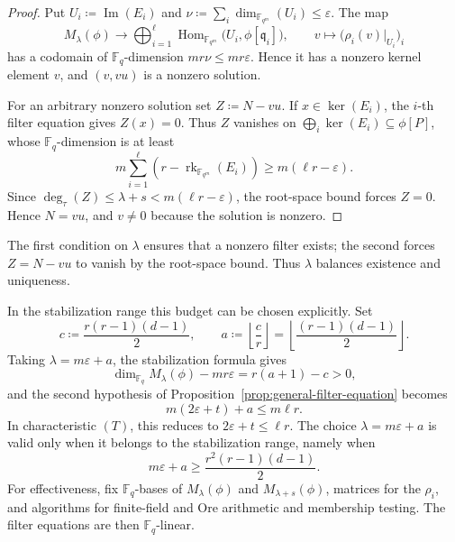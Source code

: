 \documentclass[10pt,a4paper]{amsart}
\DeclareMathOperator{\Hom}{Hom}
\DeclareMathOperator{\rk}{rk}
\theoremstyle{definition}
\theoremstyle{plain}
\theoremstyle{remark}
\newcommand{\vF}{\mathbb F}
\renewcommand{\epsilon}{\varepsilon}
\begin{document}
\begin{proof}
Put $U_i\coloneqq\operatorname{Im}(E_i)$ and
$\nu\coloneqq\sum_i\dim_{\vF_{q^m}}(U_i)\leq\epsilon$. The map
$$
M_\lambda(\phi)
\longrightarrow
\bigoplus_{i=1}^{\ell}
\Hom_{\vF_{q^m}}\bigl(U_i,\phi[\mathfrak q_i]\bigr),
\qquad
v\longmapsto\bigl(\rho_i(v)|_{U_i}\bigr)_i
$$
has a codomain of $\vF_q$-dimension $mr\nu\leq mr\epsilon$. Hence it has a
nonzero kernel element $v$, and $(v,vu)$ is a nonzero solution.

For an arbitrary nonzero solution set $Z\coloneqq N-vu$. If
$x\in\ker(E_i)$, the $i$-th filter equation gives $Z(x)=0$. Thus $Z$
vanishes on $\bigoplus_i\ker(E_i)\subseteq\phi[P]$, whose
$\vF_q$-dimension is at least
$$
m\sum_{i=1}^{\ell}
\left(r-\rk_{\vF_{q^m}}(E_i)\right)
\geq m(\ell r-\epsilon).
$$
Since $\deg_\tau(Z)\leq\lambda+s<m(\ell r-\epsilon)$, the root-space bound
forces $Z=0$. Hence $N=vu$, and $v\neq0$ because the solution is nonzero.
\end{proof}

The first condition on $\lambda$ ensures that a nonzero filter exists; the
second forces $Z=N-vu$ to vanish by the root-space bound. Thus $\lambda$
balances existence and uniqueness.

In the stabilization range this budget can be chosen explicitly. Set
$$
c\coloneqq\frac{r(r-1)(d-1)}{2},
\qquad
a\coloneqq\left\lfloor\frac{c}{r}\right\rfloor
=
\left\lfloor\frac{(r-1)(d-1)}{2}\right\rfloor.
$$
Taking $\lambda=m\epsilon+a$, the stabilization formula gives
$$
\dim_{\vF_q}M_\lambda(\phi)-mr\epsilon=r(a+1)-c>0,
$$
and the second hypothesis of Proposition~\ref{prop:general-filter-equation}
becomes
$$
m(2\epsilon+t)+a\leq m\ell r.
$$
In characteristic $(T)$, this reduces to $2\epsilon+t\leq\ell r$. The
choice $\lambda=m\epsilon+a$ is valid only when it belongs to the
stabilization range, namely when
$$
m\epsilon+a\geq \frac{r^2(r-1)(d-1)}{2}.
$$
For effectiveness, fix $\vF_q$-bases of $M_\lambda(\phi)$ and
$M_{\lambda+s}(\phi)$, matrices for the $\rho_i$, and algorithms for
finite-field and Ore arithmetic and membership testing. The filter equations
are then $\vF_q$-linear.
\end{document}
